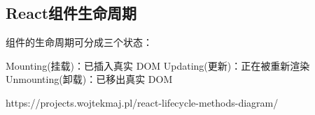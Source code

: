 \documentclass[../../../interview-questions.tex]{subfiles}
\begin{document}
\subsection{React组件生命周期}


组件的生命周期可分成三个状态：

Mounting(挂载)：已插入真实 DOM
Updating(更新)：正在被重新渲染
Unmounting(卸载)：已移出真实 DOM

https://projects.wojtekmaj.pl/react-lifecycle-methods-diagram/
\end{document}

